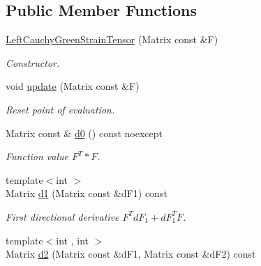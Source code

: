\subsection*{Public Member Functions}
\begin{DoxyCompactItemize}
\item 
\hyperlink{classRFFGen_1_1LinearAlgebra_1_1LeftCauchyGreenStrainTensor_a7cc082254e1cd5ef9bcd80e984adac9b}{Left\-Cauchy\-Green\-Strain\-Tensor} (Matrix const \&F)
\begin{DoxyCompactList}\small\item\em Constructor. \end{DoxyCompactList}\item 
\hypertarget{classRFFGen_1_1LinearAlgebra_1_1LeftCauchyGreenStrainTensor_a73dbd1543b5f4bf0c13b23b9962fc222}{void \hyperlink{classRFFGen_1_1LinearAlgebra_1_1LeftCauchyGreenStrainTensor_a73dbd1543b5f4bf0c13b23b9962fc222}{update} (Matrix const \&F)}\label{classRFFGen_1_1LinearAlgebra_1_1LeftCauchyGreenStrainTensor_a73dbd1543b5f4bf0c13b23b9962fc222}

\begin{DoxyCompactList}\small\item\em Reset point of evaluation. \end{DoxyCompactList}\item 
\hypertarget{classRFFGen_1_1LinearAlgebra_1_1LeftCauchyGreenStrainTensor_a5306342041dd2fc8a24863b6a0cc7368}{Matrix const \& \hyperlink{classRFFGen_1_1LinearAlgebra_1_1LeftCauchyGreenStrainTensor_a5306342041dd2fc8a24863b6a0cc7368}{d0} () const noexcept}\label{classRFFGen_1_1LinearAlgebra_1_1LeftCauchyGreenStrainTensor_a5306342041dd2fc8a24863b6a0cc7368}

\begin{DoxyCompactList}\small\item\em Function value $ F^T * F $. \end{DoxyCompactList}\item 
\hypertarget{classRFFGen_1_1LinearAlgebra_1_1LeftCauchyGreenStrainTensor_a3a49e4c9105a4a466c43d5cd262fe725}{{\footnotesize template$<$int $>$ }\\Matrix \hyperlink{classRFFGen_1_1LinearAlgebra_1_1LeftCauchyGreenStrainTensor_a3a49e4c9105a4a466c43d5cd262fe725}{d1} (Matrix const \&d\-F1) const }\label{classRFFGen_1_1LinearAlgebra_1_1LeftCauchyGreenStrainTensor_a3a49e4c9105a4a466c43d5cd262fe725}

\begin{DoxyCompactList}\small\item\em First directional derivative $ F^T dF_1 + dF_1^T F $. \end{DoxyCompactList}\item 
\hypertarget{classRFFGen_1_1LinearAlgebra_1_1LeftCauchyGreenStrainTensor_ad15848883104beb2265dfb459d96dff2}{{\footnotesize template$<$int , int $>$ }\\Matrix \hyperlink{classRFFGen_1_1LinearAlgebra_1_1LeftCauchyGreenStrainTensor_ad15848883104beb2265dfb459d96dff2}{d2} (Matrix const \&d\-F1, Matrix const \&d\-F2) const }\label{classRFFGen_1_1LinearAlgebra_1_1LeftCauchyGreenStrainTensor_ad15848883104beb2265dfb459d96dff2}


\end{DoxyCompactItemize}
